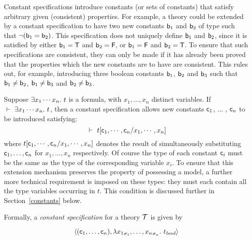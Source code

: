 Constant specifications introduce constants (or sets of constants)
that satisfy arbitrary given (consistent) properties.  For example, a
theory could be extended by a constant specification to have two new
constants ${\sf b}_1$ and ${\sf b}_2$ of type  such that
$\neg({\sf b}_1={\sf b}_2)$.  This specification does not uniquely
define ${\sf b}_1$ and ${\sf b}_2$, since it is satisfied by either
${\sf b}_1={\sf T}$ and ${\sf b}_2={\sf F}$, or ${\sf b}_1={\sf F}$ and
${\sf b}_2={\sf T}$.  To ensure that such specifications are
consistent, they can only be made if it has
already been proved that the properties which the new constants are to
have are consistent.  This rules out, for example, introducing three
boolean constants ${\sf b}_1$, ${\sf b}_2$ and ${\sf b}_3$ such that
${\sf b}_1\neq {\sf b}_2$, ${\sf b}_1\neq {\sf b}_3$ and
${\sf b}_2\neq {\sf b}_3$.

Suppose $\exists x_1\cdots x_n.\ t$ is a formula, with $x_1,\ldots, x_n$
distinct variables. If $\ \vdash\  \exists x_1 \cdots x_n.\ t$, then a
constant specification allows new constants ${\sf c}_1$, $\ldots$ ,
${\sf c}_n$ to be introduced satisfying:
\[
\ \vdash\  t[{\sf c}_1,\cdots,{\sf c}_n/x_1,\cdots,x_n]
\]
where $t[{\sf c}_1,\cdots,{\sf c}_n/x_1,\cdots,x_n]$ denotes the
result of simultaneously substituting ${\sf c}_1, \ldots, {\sf c}_n$
for $x_1, \ldots, x_n$ respectively. Of course the type of each
constant ${\sf c}_i$ must be the same as the type of the corresponding
variable $x_i$. To ensure that this extension mechanism preserves the
property of possessing a model, a further more technical requirement
is imposed on these types: they must each contain all the type
variables occurring in $t$. This condition is discussed further in
Section~\ref{constants} below.

Formally, a {\em constant specification\/}
for a theory ${\cal T}$ is given by

\medskip
{}
\[
\langle({\sf c}_1,\ldots,{\sf c}_n),
\lambda {x_1}_{\sigma_1},\ldots,{x_n}_{\sigma_n}.\ t_{\textsl{bool}}\rangle
\]

